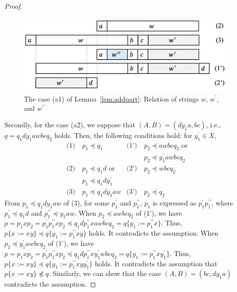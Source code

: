 \begin{proof}
  \begin{figure}[t]
    \begin{center}
      \includegraphics[scale=0.345]{figs/centerproof1.pdf}
      \caption{The case (a1) of Lemma~\ref{lem:addpart}: Relation of strings $w$, $w^{\prime}$, and $w^{\prime\prime}$}\label{fig:centerproof1}
    \end{center}
    \end{figure}

  Secondly, for the case (a2), we suppose that $(A, B) = (dy_{1}a, bc)$, i.e., $q = q_{1}dy_{1}awbcq_{2} $ holds. Then, the following conditions hold: for $y_{1}^{\prime}\in X$,
  \begin{align*}
    \textrm{(1)}~& p_{1} \preceq q_{1} & \textrm{(1')}~& p_{2} \preceq awbcq_{2}\mbox{ or} \\
    & & & p_{2} \preceq y_{1}^{\prime}awbcq_{2}\\
    \textrm{(2)}~& p_{1} \preceq q_{1}d\mbox{ or}  & \textrm{(2')}~& p_{2} \preceq wbcq_{2}\\
    & p_{1} \preceq q_{1}dy_{1}^{\prime} & & \\
    \textrm{(3)}~& p_{1} \preceq q_{1}dy_{1}aw & \textrm{(3')}~& p_{2} \preceq q_{2}
  \end{align*}
  From $p_{1} \preceq q_{1}dy_{1}aw$ of (3), for some $p^{\prime}_{1}$ and $p^{\prime\prime}_{1}$, $p_{1}$ is expressed as $p^{\prime}_{1}p^{\prime\prime}_{1}$, where $p^{\prime}_{1} \preceq q_{1}d$ and $p^{\prime\prime}_{1} \preceq y_{1}aw$. 
  When $p_{2} \preceq awbcq_{2}$ of (1'), we have $p=p_{1}xp_{2}=p^{\prime}_{1}p^{\prime\prime}_{1}xp_{2} \preceq q_{1}dp^{\prime\prime}_{1}xawbcq_{2}=q \{ y_{1}:=p^{\prime\prime}_{1}x \}$.
  Thus, $p \{ x := xy \} \preceq q \{ y_{1}:=p^{\prime\prime}_{1}xy \}$ holds. It contradicts the assumption.
  When $p_{2} \preceq y_{1}^{\prime}awbcq_{2}$ of (1'), we have $p=p_{1}xp_{2}=p^{\prime}_{1}p^{\prime\prime}_{1}xp_{2} \preceq q_{1}dp^{\prime\prime}_{1}xy_{1}^{\prime}wbcq_{2}=q \{ y_{1}:=p^{\prime\prime}_{1}xy_{1}^{\prime} \}$.
  Thus, $p \{ x := xy \} \preceq q \{ y_{1}:=p^{\prime\prime}_{1}xyy_{1}^{\prime} \}$ holds. It contradicts the assumption that $p \{ x := xy \} \not\preceq q$.
  Similarly, we can show that the case $(A, B) = (bc, dy_{1}a)$ contradicts the assumption.
  

\end{proof}
